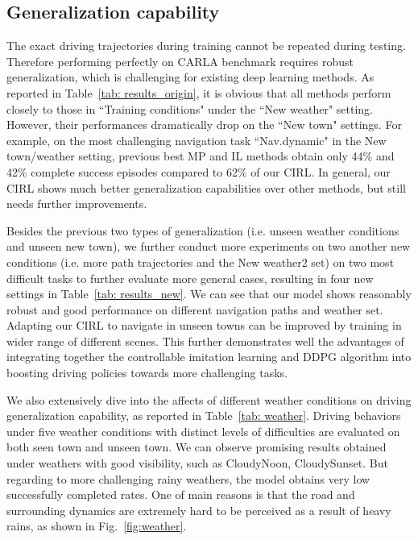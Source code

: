 \documentclass[runningheads]{llncs}
\begin{document}
\subsection{Generalization capability} The exact driving trajectories during training cannot be repeated during testing. Therefore performing perfectly on CARLA benchmark requires robust generalization, which is challenging for existing deep learning methods. As reported in Table~\ref{tab: results_origin}, it is obvious that all methods perform closely to those in ``Training conditions" under the ``New weather" setting. However, their performances dramatically drop on the ``New town" settings. For example, on the most challenging navigation task ``Nav.dynamic" in the New town/weather setting, previous best MP and IL methods obtain only 44\% and 42\% complete success episodes compared to 62\% of our CIRL. In general, our CIRL shows much better generalization capabilities over other methods, but still needs further improvements. 

Besides the previous two types of generalization (i.e. unseen weather conditions and unseen new town), we further conduct more experiments on two another new conditions (i.e. more path trajectories and the New weather2 set) on two most difficult tasks to further evaluate more general cases, resulting in four new settings in Table~\ref{tab: results_new}. We can see that our model shows reasonably robust and good performance on different navigation paths and weather set. Adapting our CIRL to navigate in unseen towns can be improved by training in wider range of different scenes. This further demonstrates well the advantages of integrating together the controllable imitation learning and DDPG algorithm into boosting driving policies towards more challenging tasks.

We also extensively dive into the affects of different weather conditions on driving generalization capability, as reported in Table~\ref{tab: weather}. Driving behaviors under five weather conditions with distinct levels of difficulties are evaluated on both seen town and unseen town. We can observe promising results obtained under weathers with good visibility, such as CloudyNoon, CloudySunset. But regarding to more challenging rainy weathers, the model obtains very low successfully completed rates. One of main reasons is that the road and surrounding dynamics are extremely hard to be perceived as a result of heavy rains, as shown in Fig.~\ref{fig:weather}.
\end{document}
